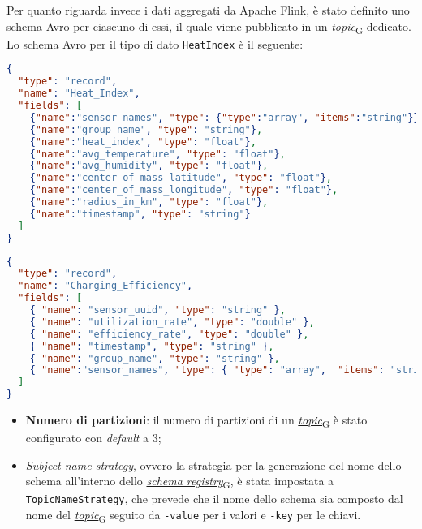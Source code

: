 Per quanto riguarda invece i dati aggregati da Apache Flink, è stato definito uno schema Avro per ciascuno di essi, il quale viene pubblicato in un \href{https://7last.github.io/docs/pb/documentazione-interna/glossario\#topic}{\textit{topic}\textsubscript{G}} dedicato.
Lo schema Avro per il tipo di dato \texttt{HeatIndex} è il seguente:
\begin{lstlisting}[language=json, caption=Schema Avro per il tipo di dato \texttt{HeatIndex},captionpos=b]
{
  "type": "record",
  "name": "Heat_Index",
  "fields": [
    {"name":"sensor_names", "type": {"type":"array", "items":"string"}},
    {"name":"group_name", "type": "string"},
    {"name":"heat_index", "type": "float"},
    {"name":"avg_temperature", "type": "float"},
    {"name":"avg_humidity", "type": "float"},
    {"name":"center_of_mass_latitude", "type": "float"},
    {"name":"center_of_mass_longitude", "type": "float"},
    {"name":"radius_in_km", "type": "float"},
    {"name":"timestamp", "type": "string"}
  ]
}

\end{lstlisting}

\begin{lstlisting}[language=json, caption=Schema Avro per il tipo di dato \texttt{ChargingEfficiency},captionpos=b]
{
  "type": "record",
  "name": "Charging_Efficiency",
  "fields": [
    { "name": "sensor_uuid", "type": "string" },
    { "name": "utilization_rate", "type": "double" },
    { "name": "efficiency_rate", "type": "double" },
    { "name": "timestamp", "type": "string" },
    { "name": "group_name", "type": "string" },
    { "name":"sensor_names", "type": { "type": "array",  "items": "string" } }
  ]
}

\end{lstlisting}

\begin{itemize}
	\item \textbf{Numero di partizioni}: il numero di partizioni di un \href{https://7last.github.io/docs/pb/documentazione-interna/glossario\#topic}{\textit{topic}\textsubscript{G}} è stato configurato con \textit{default} a 3;
	\item \textit{Subject name strategy}, ovvero la strategia per la generazione del nome dello schema all'interno dello \href{https://7last.github.io/docs/pb/documentazione-interna/glossario\#schema-registry}{\textit{schema registry}\textsubscript{G}}, è stata impostata a \texttt{TopicNameStrategy},
	      che prevede che il nome dello schema sia composto dal nome del \href{https://7last.github.io/docs/pb/documentazione-interna/glossario\#topic}{\textit{topic}\textsubscript{G}} seguito da \texttt{-value} per i valori e \texttt{-key} per le chiavi.
\end{itemize}

